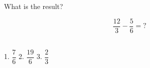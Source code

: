 \documentclass[a4paper,12pt]{article}
\begin{document}
\begin{Large}

\begin{center}

What is the result?\\[0.05cm]
		
\end{center}

$$\dfrac{12}{3} - \dfrac{5}{6} =?$$ \\[0.1cm]

\begin{center}

1. $\dfrac{7}{6}$ \hspace{0.5cm} 2. $\dfrac{19}{6}$ \hspace{0.5cm} 3. $\dfrac{2}{3}$
            
\end{center}


\end{Large}
\end{document}
